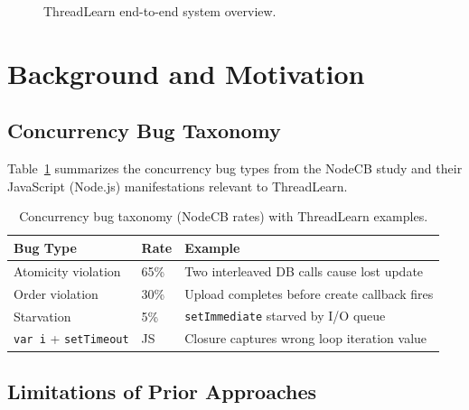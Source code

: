 \documentclass[11pt]{article}
\begin{document}
\begin{figure}[ht]
  \centering
  \caption{ThreadLearn end-to-end system overview.}
  \label{fig:overview}
\end{figure}

\section{Background and Motivation}
\label{sec:background}

\subsection{Concurrency Bug Taxonomy}

Table~\ref{tab:taxonomy} summarizes the concurrency bug types from the NodeCB
study and their JavaScript (Node.js) manifestations relevant to ThreadLearn.

\begin{table}[ht]
  \centering
  \caption{Concurrency bug taxonomy (NodeCB rates) with ThreadLearn examples.}
  \label{tab:taxonomy}
  \begin{tabular}{@{}llp{6cm}@{}}
    \toprule
    \textbf{Bug Type} & \textbf{Rate} & \textbf{Example} \\
    \midrule
    Atomicity violation & 65\% & Two interleaved DB calls cause lost update \\
    Order violation     & 30\% & Upload completes before create callback fires \\
    Starvation          & 5\%  & \texttt{setImmediate} starved by I/O queue \\
    \midrule
    \texttt{var i} + \texttt{setTimeout} & JS  & Closure captures wrong loop iteration value \\
    \bottomrule
  \end{tabular}
\end{table}

\subsection{Limitations of Prior Approaches}
\end{document}

